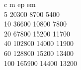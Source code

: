     c     m        ep      em     \\
    5     20300    8700    5400   \\
    10    36600    10800   7800   \\
    20    67800    15200   11700  \\
    40    102800   14000   11900  \\
    60    128800   15200   13400  \\
    100   165900   14400   13200  \\
